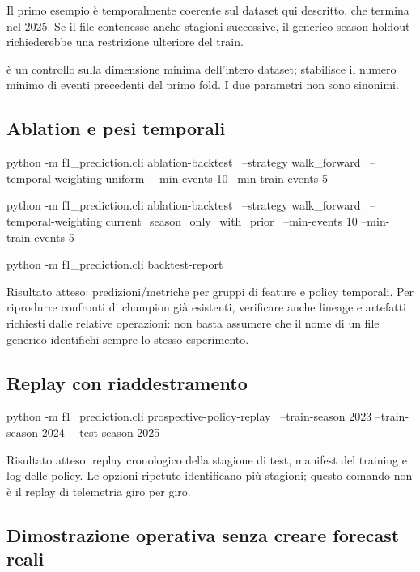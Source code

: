 \documentclass[11pt,a4paper]{article}
\newcommand{\code}[1]{{\ttfamily\small\seqsplit{#1}}}
\begin{document}
Il primo esempio è temporalmente coerente sul dataset qui descritto, che termina nel 2025. Se il file contenesse anche stagioni successive, il generico season holdout richiederebbe una restrizione ulteriore del train.

\code{--min-events 10} è un controllo sulla dimensione minima dell'intero dataset; \code{--min-train-events 5} stabilisce il numero minimo di eventi precedenti del primo fold. I due parametri non sono sinonimi.

\subsection{Ablation e pesi temporali}\label{ablation-e-pesi-temporali}

\begin{CodeBlock}
python -m f1_prediction.cli ablation-backtest \
  --strategy walk_forward \
  --temporal-weighting uniform \
  --min-events 10 --min-train-events 5

python -m f1_prediction.cli ablation-backtest \
  --strategy walk_forward \
  --temporal-weighting current_season_only_with_prior \
  --min-events 10 --min-train-events 5

python -m f1_prediction.cli backtest-report
\end{CodeBlock}

Risultato atteso: predizioni/metriche per gruppi di feature e policy temporali. Per riprodurre confronti di champion già esistenti, verificare anche lineage e artefatti richiesti dalle relative operazioni: non basta assumere che il nome di un file generico identifichi sempre lo stesso esperimento.

\subsection{Replay con riaddestramento}\label{replay-con-riaddestramento}

\begin{CodeBlock}
python -m f1_prediction.cli prospective-policy-replay \
  --train-season 2023 --train-season 2024 \
  --test-season 2025
\end{CodeBlock}

Risultato atteso: replay cronologico della stagione di test, manifest del training e log delle policy. Le opzioni ripetute identificano più stagioni; questo comando non è il replay di telemetria giro per giro.

\subsection{Dimostrazione operativa senza creare forecast reali}\label{dimostrazione-operativa-senza-creare-forecast-reali}
\end{document}

